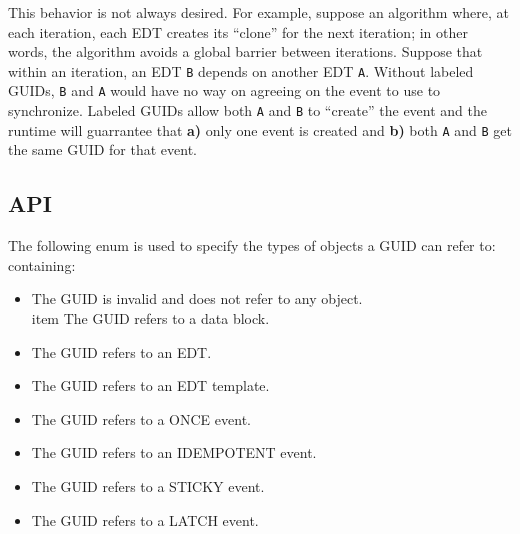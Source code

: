 This behavior is not always desired. For example, suppose an algorithm
where, at each iteration, each EDT creates its ``clone'' for the next
iteration; in other words, the algorithm avoids a global barrier
between iterations. Suppose that within an iteration, an EDT \texttt{B}
depends on another EDT \texttt{A}. Without labeled GUIDs, \texttt{B}
and \texttt{A} would have no way on agreeing on the event to use to
synchronize. Labeled GUIDs allow both \texttt{A} and \texttt{B} to
``create'' the event and the runtime will guarrantee that {\bf a)}
only one event is created and {\bf b)} both \texttt{A} and \texttt{B}
get the same GUID for that event.
\subsection{API}
The following enum is used to specify the types of objects a GUID can
refer to:
\hypertarget{type_ocrGuidUserKind}{}
containing:
\begin{itemize}
\item {} The GUID is invalid and does not refer
  to any object.
\\item {} The GUID refers to a data block.
\item {} The GUID refers to an EDT.
\item {} The GUID refers to an EDT
  template.
\item {} The GUID refers to a ONCE event.
\item {} The GUID refers to an IDEMPOTENT
  event.
\item {} The GUID refers to a STICKY
  event.
\item {} The GUID refers to a LATCH
  event.
\end{itemize}

